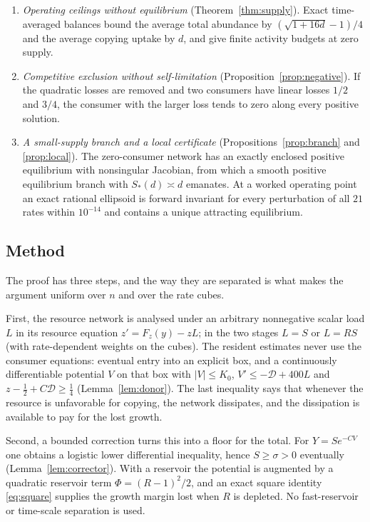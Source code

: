 \documentclass[11pt,a4paper]{article}
\theoremstyle{plain}
\theoremstyle{definition}
\theoremstyle{remark}
\newcommand{\D}{\mathcal D}
\begin{document}
\begin{enumerate}[label=(\roman*)]
\item \emph{Operating ceilings without equilibrium} (Theorem~\ref{thm:supply}). Exact time-averaged balances bound the average total abundance by $(\sqrt{1+16d}-1)/4$ and the average copying uptake by $d$, and give finite activity budgets at zero supply.
\item \emph{Competitive exclusion without self-limitation} (Proposition~\ref{prop:negative}). If the quadratic losses are removed and two consumers have linear losses $1/2$ and $3/4$, the consumer with the larger loss tends to zero along every positive solution.
\item \emph{A small-supply branch and a local certificate} (Propositions~\ref{prop:branch} and \ref{prop:local}). The zero-consumer network has an exactly enclosed positive equilibrium with nonsingular Jacobian, from which a smooth positive equilibrium branch with $S_*(d)\asymp d$ emanates. At a worked operating point an exact rational ellipsoid is forward invariant for every perturbation of all $21$ rates within $10^{-14}$ and contains a unique attracting equilibrium.
\end{enumerate}

\subsection{Method}
The proof has three steps, and the way they are separated is what makes the argument uniform over $n$ and over the rate cubes.

First, the resource network is analysed under an arbitrary nonnegative scalar load $L$ in its resource equation $z'=F_z(y)-zL$; in the two stages $L=S$ or $L=RS$ (with rate-dependent weights on the cubes). The resident estimates never use the consumer equations: eventual entry into an explicit box, and a continuously differentiable potential $V$ on that box with $|V|\le K_0$, $V'\le-\D+400L$ and $z-\tfrac12+C\D\ge\tfrac14$ (Lemma~\ref{lem:donor}). The last inequality says that whenever the resource is unfavorable for copying, the network dissipates, and the dissipation is available to pay for the lost growth.

Second, a bounded correction turns this into a floor for the total. For $Y=Se^{-CV}$ one obtains a logistic lower differential inequality, hence $S\ge\sigma>0$ eventually (Lemma~\ref{lem:corrector}). With a reservoir the potential is augmented by a quadratic reservoir term $\Phi=(R-1)^2/2$, and an exact square identity \eqref{eq:square} supplies the growth margin lost when $R$ is depleted. No fast-reservoir or time-scale separation is used.
\end{document}
